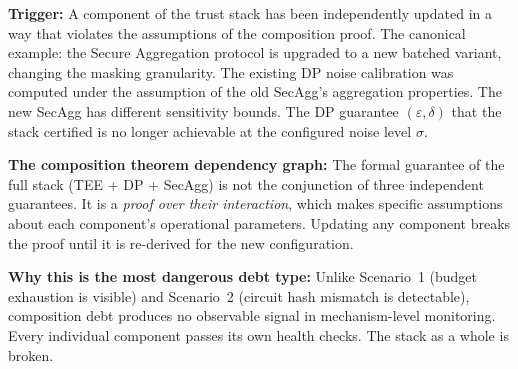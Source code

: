 \begin{tcolorbox}[scenariobox,
  title={Scenario 3 --- The Broken Composition Guarantee
         (Type~3 Debt)}]

\textbf{Trigger:}
A component of the trust stack has been independently updated
in a way that violates the assumptions of the composition
proof.
The canonical example: the Secure Aggregation protocol is
upgraded to a new batched variant, changing the masking
granularity.
The existing DP noise calibration was computed under the
assumption of the old SecAgg's aggregation properties.
The new SecAgg has different sensitivity bounds.
The DP guarantee $(\varepsilon, \delta)$ that the stack
certified is no longer achievable at the configured noise
level $\sigma$.

\textbf{The composition theorem dependency graph:}
The formal guarantee of the full stack
(TEE + DP + SecAgg) is not the conjunction
of three independent guarantees.
It is a \emph{proof over their interaction}, which makes
specific assumptions about each component's operational
parameters.
Updating any component breaks the proof until it is
re-derived for the new configuration.

\textbf{Why this is the most dangerous debt type:}
Unlike Scenario~1 (budget exhaustion is visible) and
Scenario~2 (circuit hash mismatch is detectable),
composition debt produces no observable signal in
mechanism-level monitoring.
Every individual component passes its own health checks.
The stack as a whole is broken.
\end{tcolorbox}

